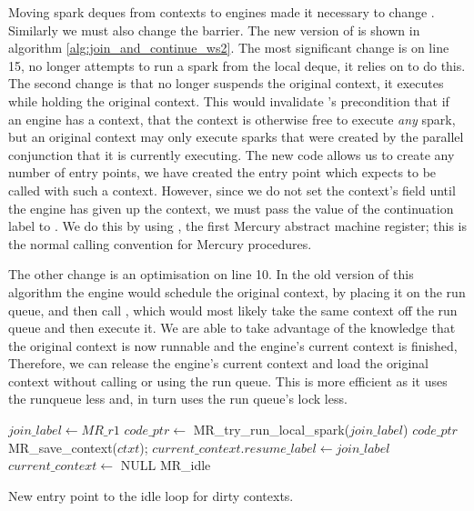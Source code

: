 Moving spark deques from contexts to engines made it necessary to change
\idle.
Similarly we must also change the \joinandcontinue barrier.
The new version of \joinandcontinue is shown in algorithm
\ref{alg:join_and_continue_ws2}.
The most significant change is on line 15,
\joinandcontinue no longer attempts to run a spark from the local deque,
it relies on \idle to do this.
The second change is that \joinandcontinue no longer suspends the original
context, it executes \idle while holding the original context.
This would invalidate \idle's precondition that if an engine has a context,
that the context is otherwise free to execute \emph{any} spark,
but an original context may only execute sparks that were created by the
parallel conjunction that it is currently executing.
The new \idle code allows us to create any number of entry points,
we have created the \idleorigcontext entry point which expects to be called
with such a context.
However, since we do not set the context's  field until
the engine has given up the context,
we must pass the value of the continuation label to \idleorigcontext.
We do this by using , the first Mercury abstract machine
register;
this is the normal calling convention for Mercury procedures.

The other change is an optimisation on line 10.
In the old version of this algorithm the engine would schedule the original
context,
by placing it on the run queue,
and then call \idle,
which would most likely take the same context off the run queue and then
execute it.
We are able to take advantage of the knowledge that the original context is
now runnable and the engine's current context is finished,
Therefore, we can release the engine's current context and load the original
context without calling \idle or using the run queue.
This is more efficient as it uses the runqueue less and,
in turn uses the run queue's lock less.

\begin{algorithm}[tbp]
\begin{algorithmic}
        \State $join\_label \gets MR\_r1$
        \State $code\_ptr \gets$ MR\_try\_run\_local\_spark($join\_label$)
            \Goto $code\_ptr$
        \EndIf
        \State MR\_save\_context($ctxt$);
        \State $current\_context.resume\_label \gets join\_label$
        \State $current\_context \gets$ NULL
        \Goto MR\_idle
    \EndProcedure
\end{algorithmic}
\caption{New entry point to the idle loop for dirty contexts.}
\label{alg:idle_orig_context}
\end{algorithm}

